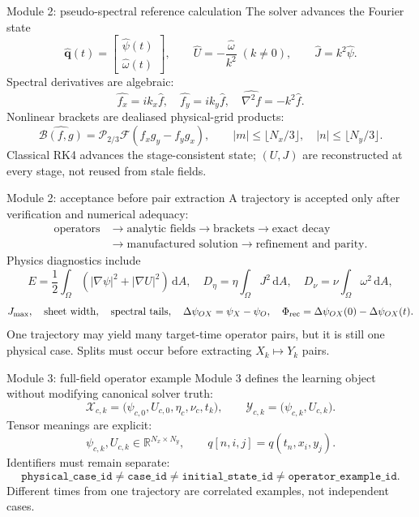 \documentclass[aspectratio=169,11pt]{beamer}
\newcommand{\dd}{\,\mathrm{d}}
\newcommand{\vect}[1]{\bm{#1}}
\newcommand{\code}[1]{\texttt{#1}}
\newcommand{\currentmodule}{Module 1}
\newcommand{\moduleprogress}{1 of 4}
\newcommand{\setmodule}[2]{%
  \renewcommand{\currentmodule}{#1}%
  \renewcommand{\moduleprogress}{#2}%
}
\begin{document}
\setmodule{Module 2}{3 of 4}
\begin{frame}[t]{Module 2: pseudo-spectral reference calculation}
\vspace{-0.15em}
The solver advances the Fourier state
\[
\widehat{\vect q}(t)=\begin{bmatrix}\widehat\psi(t)\\ \widehat\omega(t)\end{bmatrix},
\qquad
\widehat U=-\frac{\widehat\omega}{k^2}\;(k\ne0),
\qquad
\widehat J=k^2\widehat\psi.
\]
Spectral derivatives are algebraic:
\[
\widehat{f_x}=ik_x\widehat f,
\quad
\widehat{f_y}=ik_y\widehat f,
\quad
\widehat{\nabla^2 f}=-k^2\widehat f.
\]
Nonlinear brackets are dealiased physical-grid products:
\[
\widehat{\mathcal B(f,g)}=\mathcal P_{2/3}\mathcal F(f_xg_y-f_yg_x),
\qquad
|m|\le\lfloor N_x/3\rfloor,
\quad
|n|\le\lfloor N_y/3\rfloor.
\]
Classical RK4 advances the stage-consistent state; $(U,J)$ are reconstructed at every stage, not reused from stale fields.
\end{frame}

\setmodule{Module 2}{4 of 4}
\begin{frame}[t]{Module 2: acceptance before pair extraction}
\vspace{-0.15em}
A trajectory is accepted only after verification and numerical adequacy:
\[
\begin{aligned}
\text{operators}&\rightarrow\text{analytic fields}\rightarrow\text{brackets}\rightarrow\text{exact decay}\\
&\rightarrow\text{manufactured solution}\rightarrow\text{refinement and parity}.
\end{aligned}
\]
Physics diagnostics include
\[
E=\frac12\int_\Omega(|\nabla\psi|^2+|\nabla U|^2)\dd A,
\quad
D_\eta=\eta\int_\Omega J^2\dd A,
\quad
D_\nu=\nu\int_\Omega\omega^2\dd A,
\]
\[
J_{\max},\quad \text{sheet width},\quad \text{spectral tails},\quad
\Delta\psi_{OX}=\psi_X-\psi_O,
\quad
\Phi_{\rm rec}=\Delta\psi_{OX}(0)-\Delta\psi_{OX}(t).
\]
One trajectory may yield many target-time operator pairs, but it is still one physical case. Splits must occur before extracting $X_k\mapsto Y_k$ pairs.
\end{frame}


\setmodule{Module 3}{1 of 4}
\begin{frame}[t]{Module 3: full-field operator example}
\vspace{-0.15em}
Module 3 defines the learning object without modifying canonical solver truth:
\[
\boxed{
\mathcal X_{c,k}=\bigl(\psi_{c,0},U_{c,0},\eta_c,\nu_c,t_k\bigr),
\qquad
\mathcal Y_{c,k}=\bigl(\psi_{c,k},U_{c,k}\bigr).}
\]
Tensor meanings are explicit:
\[
\psi_{c,k},U_{c,k}\in\mathbb R^{N_x\times N_y},
\qquad
q[n,i,j]=q(t_n,x_i,y_j).
\]
Identifiers must remain separate:
\[
\code{physical\_case\_id}\ne\code{case\_id}\ne\code{initial\_state\_id}\ne\code{operator\_example\_id}.
\]
Different times from one trajectory are correlated examples, not independent cases.
\end{frame}
\end{document}
